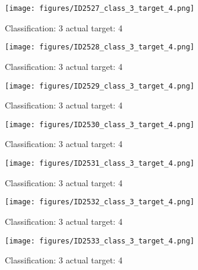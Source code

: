\begin{figure}[h!]
\begin{center}
\texttt{[image: figures/ID2527\_class\_3\_target\_4.png]}
\end{center}
\caption{ Classification: 3 actual target: 4}
\label{fig:ID2527_class_3_target_4}
\end{figure}
\begin{figure}[h!]
\begin{center}
\texttt{[image: figures/ID2528\_class\_3\_target\_4.png]}
\end{center}
\caption{ Classification: 3 actual target: 4}
\label{fig:ID2528_class_3_target_4}
\end{figure}
\begin{figure}[h!]
\begin{center}
\texttt{[image: figures/ID2529\_class\_3\_target\_4.png]}
\end{center}
\caption{ Classification: 3 actual target: 4}
\label{fig:ID2529_class_3_target_4}
\end{figure}
\begin{figure}[h!]
\begin{center}
\texttt{[image: figures/ID2530\_class\_3\_target\_4.png]}
\end{center}
\caption{ Classification: 3 actual target: 4}
\label{fig:ID2530_class_3_target_4}
\end{figure}
\begin{figure}[h!]
\begin{center}
\texttt{[image: figures/ID2531\_class\_3\_target\_4.png]}
\end{center}
\caption{ Classification: 3 actual target: 4}
\label{fig:ID2531_class_3_target_4}
\end{figure}
\begin{figure}[h!]
\begin{center}
\texttt{[image: figures/ID2532\_class\_3\_target\_4.png]}
\end{center}
\caption{ Classification: 3 actual target: 4}
\label{fig:ID2532_class_3_target_4}
\end{figure}
\begin{figure}[h!]
\begin{center}
\texttt{[image: figures/ID2533\_class\_3\_target\_4.png]}
\end{center}
\caption{ Classification: 3 actual target: 4}
\label{fig:ID2533_class_3_target_4}
\end{figure}

